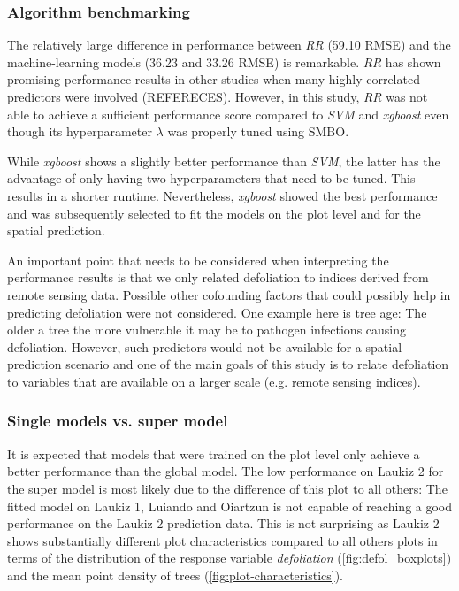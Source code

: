 \documentclass[review]{elsarticle}
\begin{document}
\subsubsection{Algorithm benchmarking}

\noindent The relatively large difference in performance between \textit{RR} (59.10 RMSE) and the machine-learning models (36.23 and 33.26 RMSE) is remarkable.
\textit{RR} has shown promising performance results in other studies when many highly-correlated predictors were involved (REFERECES).
However, in this study, \textit{RR} was not able to achieve a sufficient performance score compared to \textit{SVM} and \textit{xgboost} even though its hyperparameter $\lambda$ was properly tuned using SMBO.

While \textit{xgboost} shows a slightly better performance than \textit{SVM}, the latter has the advantage of only having two hyperparameters that need to be tuned.
This results in a shorter runtime.
Nevertheless, \textit{xgboost} showed the best performance and was subsequently selected to fit the models on the plot level and for the spatial prediction.

An important point that needs to be considered when interpreting the performance results is that we only related defoliation to indices derived from remote sensing data.
Possible other cofounding factors that could possibly help in predicting defoliation were not considered.
One example here is tree age: The older a tree the more vulnerable it may be to pathogen infections causing defoliation.
However, such predictors would not be available for a spatial prediction scenario and one of the main goals of this study is to relate defoliation to variables that are available on a larger scale (e.g. remote sensing indices).

\subsubsection{Single models vs. super model}

It is expected that models that were trained on the plot level only achieve a better performance than the global model.
The low performance on Laukiz 2 for the super model is most likely due to the difference of this plot to all others: The fitted model on Laukiz 1, Luiando and Oiartzun is not capable of reaching a good performance on the Laukiz 2 prediction data.
This is not surprising as Laukiz 2 shows substantially different plot characteristics compared to all others plots in terms of the distribution of the response variable \textit{defoliation} (\autoref{fig:defol_boxplots}) and the mean point density of trees (\autoref{fig:plot-characteristics}).
\end{document}
